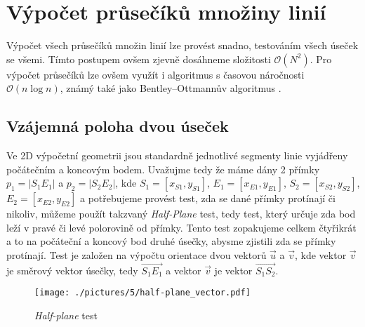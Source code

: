 \section{Výpočet průsečíků množiny linií}
Výpočet všech průsečíků množin linií lze provést snadno, testováním všech úseček se všemi. Tímto postupem ovšem zjevně dosáhneme složitosti $\mathcal{O}(N^2)$. Pro výpočet průsečíků lze ovšem využít i algoritmus s časovou náročnosti $\mathcal{O}(n\log{}n)$, známý také jako Bentley–Ottmannův algoritmus \cite{bentley1979algorithms}.

\subsection{Vzájemná poloha dvou úseček}
Ve 2D výpočetní geometrii jsou standardně jednotlivé segmenty linie vyjádřeny počátečním a koncovým bodem. Uvažujme tedy že máme dány 2 přímky $p_1 = |S_1 E_1|$ a $p_2 = |S_2 E_2|$, kde $S_1 = [x_{S1},y_{S1}]$, $E_1 = [x_{E1},y_{E1}]$, $S_2 = [x_{S2},y_{S2}]$, $E_2 = [x_{E2},y_{E2}]$ a potřebujeme provést test, zda se dané přímky protínají či nikoliv, můžeme použít takzvaný \textit{Half-Plane} test, tedy test, který určuje zda bod leží v pravé či levé polorovině od přímky. Tento test zopakujeme celkem čtyřikrát a to na počáteční a koncový bod druhé úsečky, abysme zjistili zda se přímky protínají. Test je založen na výpočtu orientace dvou vektorů $\vec{u}$  a $\vec{v}$, kde vektor $\vec{v}$ je směrový vektor úsečky, tedy $\overrightarrow{S_1E_1}$ a vektor $\vec{v}$ je vektor $\overrightarrow{S_1S_2}$.	

\begin{figure}[h]
  \centering
  \texttt{[image: ./pictures/5/half-plane\_vector.pdf]}
  \caption{\textit{Half-plane} test}
  \label{fig:2-half_plane_vector}
\end{figure}

